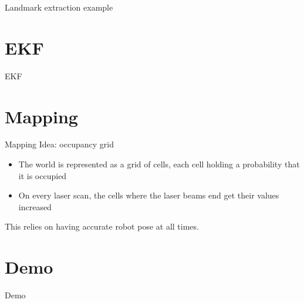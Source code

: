 \documentclass[xcolor=dvipsnames]{beamer}
\begin{document}
  {
  \begin{frame}{Landmark extraction example}
  \end{frame}
  }

  \section{EKF}
  \begin{frame}{EKF}
    
  \end{frame}

  \section{Mapping}
  \begin{frame}{Mapping}
    Idea: occupancy grid
    \vspace{1cm}

    \begin{itemize}
    \item The world is represented as a grid of cells, each cell holding a
          probability that it is occupied
    \item On every laser scan, the cells where the laser beams end get their
          values increased
    \end{itemize}
    \vspace{1cm}

    This relies on having accurate robot pose at all times.
  \end{frame}
  
  \section{Demo}
  \begin{frame}{Demo}
    
  \end{frame}
  
\end{document}
